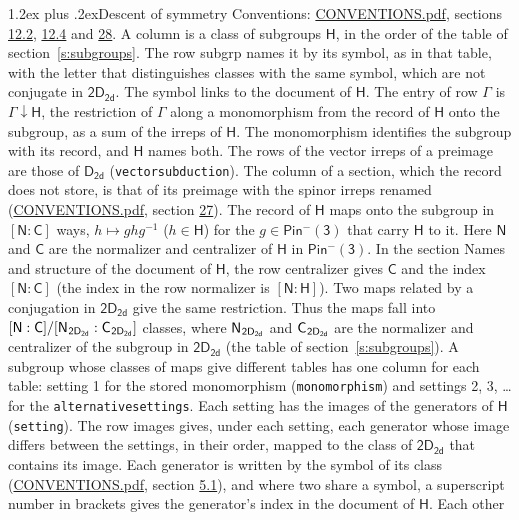 \documentclass[10pt,a4paper]{article}
\makeatletter
\renewcommand\section{\@startsection{section}{1}{\z@}{-3ex plus -1ex minus -.2ex}%
  {1.2ex plus .2ex}{\normalfont\large\sffamily\bfseries\color{parttitle}}}
\numberwithin{equation}{section}
\newcommand{\grp}[1]{\mathsf{#1}}
\newcommand{\grpindex}[2]{[#1 : #2]}
\newcommand{\restr}[2]{#1\!\downarrow#2}
\newcommand{\hairsp}{\mkern1mu}
\makeatother
\begin{document}
\section{Descent of symmetry}\label{s:subduction}
Conventions: \href{../../CONVENTIONS.pdf}{CONVENTIONS.pdf}, sections \href{../../../rotation/CONVENTIONS.pdf\#conv.12.2}{12.2}, \href{../../../rotation/CONVENTIONS.pdf\#conv.12.4}{12.4} and \href{../../CONVENTIONS.pdf\#conv.28}{28}.
A column is a class of subgroups $\grp{H}$, in the order of the table of section~\ref{s:subgroups}. The row subgrp names it by its symbol, as in that table, with the letter that distinguishes classes with the same symbol, which are not conjugate in $\grp{2D_{2d}}$. The symbol links to the document of $\grp{H}$. The entry of row $\Gamma$ is $\restr{\Gamma}{\grp{H}}$, the restriction of $\Gamma$ along a monomorphism from the record of $\grp{H}$ onto the subgroup, as a sum of the irreps of $\grp{H}$. The monomorphism identifies the subgroup with its record, and $\grp{H}$ names both. The rows of the vector irreps of a preimage are those of \href{../../../rotation/data/pdf/D2d.pdf}{$\grp{D_{2d}}$} (\texttt{vectorsubduction}). The column of a section, which the record does not store, is that of its preimage with the spinor irreps renamed (\href{../../CONVENTIONS.pdf}{CONVENTIONS.pdf}, section \href{../../CONVENTIONS.pdf\#conv.27}{27}). \label{n:group.normalizer.o3}\label{n:group.centralizer.o3}\label{n:element.h}The record of $\grp{H}$ maps onto the subgroup in $\grpindex{\grp{N}}{\grp{C}}$ ways, $h \mapsto g h g^{-1}$ ($h \in \grp{H}$) for the $g \in \grp{Pin^{-}(3)}$ that carry $\grp{H}$ to it. Here $\grp{N}$ and $\grp{C}$ are the normalizer and centralizer of $\grp{H}$ in \href{Pinminus3.pdf}{$\grp{Pin^{-}(3)}$}. In the section Names and structure of the document of $\grp{H}$, the row centralizer gives $\grp{C}$ and the index $\grpindex{\grp{N}}{\grp{C}}$ (the index in the row normalizer is $\grpindex{\grp{N}}{\grp{H}}$). Two maps related by a conjugation in $\grp{2D_{2d}}$ give the same restriction. Thus the maps fall into $\grpindex{\grp{N}}{\grp{C}}/\grpindex{\grp{N}_{\hairsp \grp{2D_{2d}}}}{\grp{C}_{\hairsp \grp{2D_{2d}}}}$ classes, where $\grp{N}_{\hairsp \grp{2D_{2d}}}$ and $\grp{C}_{\hairsp \grp{2D_{2d}}}$ are the normalizer and centralizer of the subgroup in $\grp{2D_{2d}}$ (the table of section~\ref{s:subgroups}). \label{n:head.setting}A subgroup whose classes of maps give different tables has one column for each table: setting 1 for the stored monomorphism (\texttt{monomorphism}) and settings 2, 3, \dots{} for the \texttt{alternativesettings}. Each setting has the images of the generators of $\grp{H}$ (\texttt{setting}). \label{n:head.images}The row images gives, under each setting, each generator whose image differs between the settings, in their order, mapped to the class of $\grp{2D_{2d}}$ that contains its image. \label{n:element.generator.index}Each generator is written by the symbol of its class (\href{../../CONVENTIONS.pdf}{CONVENTIONS.pdf}, section \href{../../../rotation/CONVENTIONS.pdf\#conv.5.1}{5.1}), and where two share a symbol, a superscript number in brackets gives the generator's index in the document of $\grp{H}$. \label{n:irrep.Delta}Each other 
\end{document}
